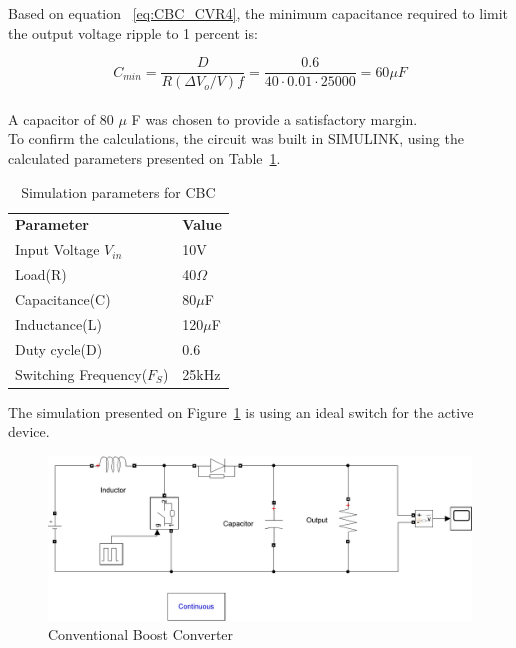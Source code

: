 Based on equation ~\ref{eq:CBC_CVR4}, the minimum capacitance required to limit the output voltage ripple to 1 percent is:

\begin{equation}
C_{min} = \frac{D}{R(\Delta V_o/V)f} = \frac{0.6}{40\cdot 0.01\cdot 25000 } = 60\mu F
\end{equation}\\
A capacitor of 80 $\mu$ F was chosen to provide a satisfactory margin.\\

To confirm the calculations, the circuit was built in SIMULINK, using the calculated parameters presented on Table~\ref{tab:CBC}.

\begin{table}[H]
\begin{center}
\caption {Simulation parameters for CBC} \label{tab:CBC} 
\begin{tabular}{|l|l|}
\cline{1-2}
\textbf{Parameter} & \textbf{Value}  \\ \cline{1-2}
Input Voltage $V_{in}$          &      10V   \\ \cline{1-2}
Load(R)   & 40$\Omega$           \\ \cline{1-2}
Capacitance(C)          &       80$\mu$F     \\ \cline{1-2}
Inductance(L)          &      120$\mu$F      \\ \cline{1-2}
Duty cycle(D)          &     0.6       \\ \cline{1-2}
Switching Frequency($F_S$)          &      25kHz      \\ \cline{1-2}
\end{tabular}
\end{center}
\end{table}

The simulation presented on Figure~\ref{fig:CBC_Sim} is using an ideal switch for the active device.

\begin{figure}[H]
   \centering
   \includegraphics[width=\textwidth]{figures/aConventionalBoost/CBCpic.pdf}
    \caption{Conventional Boost Converter}
	\label{fig:CBC_Sim}
\end{figure}

